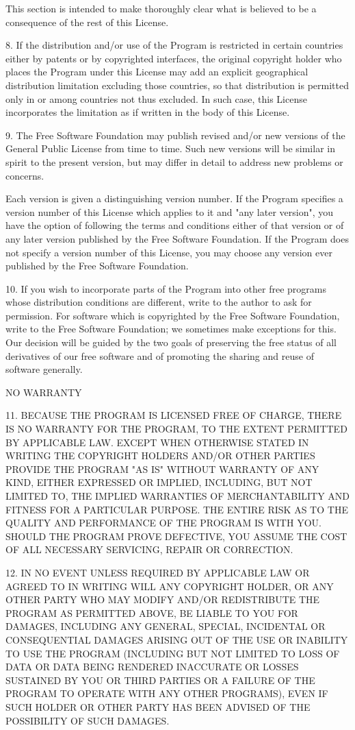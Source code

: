 \begin{small}
This section is intended to make thoroughly clear what is believed to be a
consequence of the rest of this License.

8. If the distribution and/or use of the Program is restricted in certain
countries either by patents or by copyrighted interfaces, the original
copyright holder who places the Program under this License may add an explicit
geographical distribution limitation excluding those countries, so that
distribution is permitted only in or among countries not thus excluded. In
such case, this License incorporates the limitation as if written in the body
of this License.

9. The Free Software Foundation may publish revised and/or new versions of the
General Public License from time to time. Such new versions will be similar in
spirit to the present version, but may differ in detail to address new
problems or concerns.

Each version is given a distinguishing version number. If the Program
specifies a version number of this License which applies to it and "any later
version", you have the option of following the terms and conditions either of
that version or of any later version published by the Free Software
Foundation. If the Program does not specify a version number of this License,
you may choose any version ever published by the Free Software Foundation.

10. If you wish to incorporate parts of the Program into other free programs
whose distribution conditions are different, write to the author to ask for
permission. For software which is copyrighted by the Free Software Foundation,
write to the Free Software Foundation; we sometimes make exceptions for this.
Our decision will be guided by the two goals of preserving the free status of
all derivatives of our free software and of promoting the sharing and reuse of
software generally.

NO WARRANTY

11. BECAUSE THE PROGRAM IS LICENSED FREE OF CHARGE, THERE IS NO WARRANTY FOR
THE PROGRAM, TO THE EXTENT PERMITTED BY APPLICABLE LAW. EXCEPT WHEN OTHERWISE
STATED IN WRITING THE COPYRIGHT HOLDERS AND/OR OTHER PARTIES PROVIDE THE
PROGRAM "AS IS" WITHOUT WARRANTY OF ANY KIND, EITHER EXPRESSED OR IMPLIED,
INCLUDING, BUT NOT LIMITED TO, THE IMPLIED WARRANTIES OF MERCHANTABILITY AND
FITNESS FOR A PARTICULAR PURPOSE. THE ENTIRE RISK AS TO THE QUALITY AND
PERFORMANCE OF THE PROGRAM IS WITH YOU. SHOULD THE PROGRAM PROVE DEFECTIVE,
YOU ASSUME THE COST OF ALL NECESSARY SERVICING, REPAIR OR CORRECTION.

12. IN NO EVENT UNLESS REQUIRED BY APPLICABLE LAW OR AGREED TO IN WRITING WILL
ANY COPYRIGHT HOLDER, OR ANY OTHER PARTY WHO MAY MODIFY AND/OR REDISTRIBUTE
THE PROGRAM AS PERMITTED ABOVE, BE LIABLE TO YOU FOR DAMAGES, INCLUDING ANY
GENERAL, SPECIAL, INCIDENTAL OR CONSEQUENTIAL DAMAGES ARISING OUT OF THE USE
OR INABILITY TO USE THE PROGRAM (INCLUDING BUT NOT LIMITED TO LOSS OF DATA OR
DATA BEING RENDERED INACCURATE OR LOSSES SUSTAINED BY YOU OR THIRD PARTIES OR
A FAILURE OF THE PROGRAM TO OPERATE WITH ANY OTHER PROGRAMS), EVEN IF SUCH
HOLDER OR OTHER PARTY HAS BEEN ADVISED OF THE POSSIBILITY OF SUCH DAMAGES.
\end{small}
